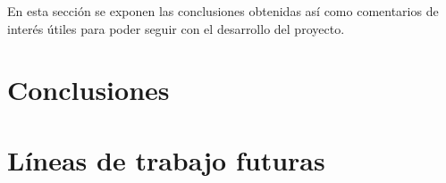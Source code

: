 
En esta sección se exponen las conclusiones obtenidas así como comentarios de interés útiles para poder seguir con el desarrollo del proyecto.

\section{Conclusiones}

\section{Líneas de trabajo futuras}


